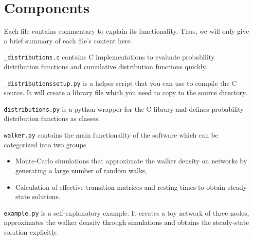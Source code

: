 \documentclass[twocolumn]{revtex4}
\begin{document}
\section{Components}\label{sec:components}

Each file contains commentary to explain its functionality. Thus, we will only give a brief summary of each file's content here.

{\tt \_distributions.c} contains C implementations to evaluate probability distribution functions and cumulative distribution functions quickly.

{\tt \_distributionssetup.py} is a helper script that you can use to compile the C source. It will create a library file which you need to copy to the source directory.

{\tt distributions.py} is a python wrapper for the C library and defines probability distribution functions as classes.

{\tt walker.py} contains the main functionality of the software which can be categorized into two groups
\begin{itemize}
	\item Monte-Carlo simulations that approximate the walker density on networks by generating a large number of random walks,
	\item Calculation of effective transition matrices and resting times to obtain steady state solutions.
\end{itemize}

{\tt example.py} is a self-explanatory example. It creates a toy network of three nodes, approximates the walker density through simulations and obtains the steady-state solution explicitly.



\end{document}
